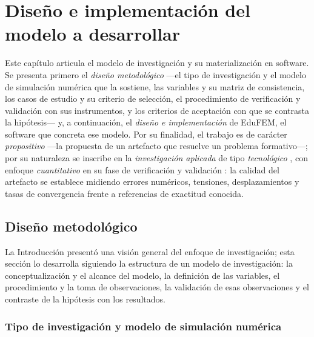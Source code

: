 \chapter{Diseño e implementación del modelo a desarrollar}
\label{cap:diseno}

Este capítulo articula el modelo de investigación y su materialización en software. Se presenta primero el \emph{diseño metodológico} —el tipo de investigación y el modelo de simulación numérica que la sostiene, las variables y su matriz de consistencia, los casos de estudio y su criterio de selección, el procedimiento de verificación y validación con sus instrumentos, y los criterios de aceptación con que se contrasta la hipótesis— y, a continuación, el \emph{diseño e implementación} de EduFEM, el software que concreta ese modelo. Por su finalidad, el trabajo es de carácter \emph{propositivo} —la propuesta de un artefacto que resuelve un problema formativo—; por su naturaleza se inscribe en la \emph{investigación aplicada} de tipo \emph{tecnológico} \autocite[pp.~90-92]{garciacordoba2005tecnologica}, con enfoque \emph{cuantitativo} en su fase de verificación y validación \autocite[p.~6]{sampieri2018metodologia}: la calidad del artefacto se establece midiendo errores numéricos, tensiones, desplazamientos y tasas de convergencia frente a referencias de exactitud conocida.

\section{Diseño metodológico}
\label{sec:metodologia}

La Introducción presentó una visión general del enfoque de investigación; esta sección lo desarrolla siguiendo la estructura de un modelo de investigación: la conceptualización y el alcance del modelo, la definición de las variables, el procedimiento y la toma de observaciones, la validación de esas observaciones y el contraste de la hipótesis con los resultados.

\subsection{Tipo de investigación y modelo de simulación numérica}
\label{sec:proceso-met}

